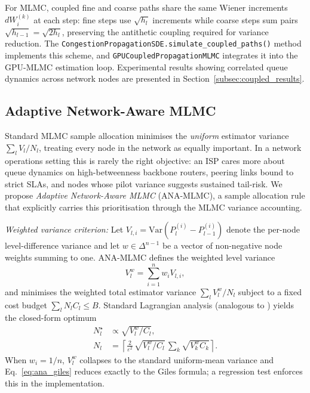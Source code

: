 \documentclass[journal]{IEEEtran}
\begin{document}
For MLMC, coupled fine and coarse paths share the same Wiener increments $dW_i^{(k)}$ at each
step: fine steps use $\sqrt{h_l}$ increments while coarse steps sum pairs
$\sqrt{h_{l-1}}=\sqrt{2h_l}$, preserving the antithetic coupling required for variance
reduction. The \texttt{CongestionPropagationSDE.simulate\_coupled\_paths()} method implements
this scheme, and \texttt{GPUCoupledPropagationMLMC} integrates it into the GPU-MLMC estimation
loop. Experimental results showing correlated queue dynamics across network nodes are presented
in Section~\ref{subsec:coupled_results}.

\subsection{Adaptive Network-Aware MLMC}
\label{subsec:ana_mlmc}

Standard MLMC sample allocation \cite{giles2015multilevel} minimises the \emph{uniform}
estimator variance $\sum_l V_l/N_l$, treating every node in the network as equally important. In
a network operations setting this is rarely the right objective: an ISP cares more about queue
dynamics on high-betweenness backbone routers, peering links bound to strict SLAs, and nodes
whose pilot variance suggests sustained tail-risk. We propose \emph{Adaptive Network-Aware MLMC}
(ANA-MLMC), a sample allocation rule that explicitly carries this prioritisation through the
MLMC variance accounting.

\textit{Weighted variance criterion:}
Let $V_{l,i} = \mathrm{Var}(P_l^{(i)} - P_{l-1}^{(i)})$ denote the per-node level-difference
variance and let $w \in \Delta^{n-1}$ be a vector of non-negative node weights summing to one.
ANA-MLMC defines the weighted level variance
\begin{equation}
    V_l^{w} = \sum_{i=1}^{n} w_i V_{l,i},
    \label{eq:ana_var}
\end{equation}
and minimises the weighted total estimator variance $\sum_l V_l^{w}/N_l$ subject to a fixed cost
budget $\sum_l N_l C_l \leq B$. Standard Lagrangian analysis (analogous to
\cite{giles2015multilevel}) yields the closed-form optimum
\begin{align}
    N_l^{\star} &\propto \sqrt{V_l^{w}/C_l}, \nonumber \\
    N_l &= \left\lceil \frac{2}{\varepsilon^{2}}\,
    \sqrt{V_l^{w}/C_l}\, \sum_k \sqrt{V_k^{w} C_k} \right\rceil .
    \label{eq:ana_giles}
\end{align}
When $w_i=1/n$, $V_l^{w}$ collapses to the standard uniform-mean variance and
Eq.~\eqref{eq:ana_giles} reduces exactly to the Giles formula; a regression test enforces this
in the implementation.
\end{document}
